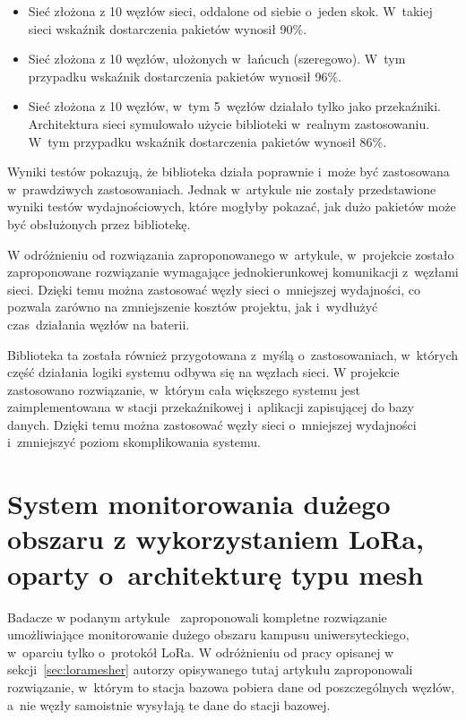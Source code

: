 \begin{itemize}
    \item Sieć złożona z 10 węzłów sieci, oddalone od siebie o~jeden skok. W~takiej sieci wskaźnik dostarczenia pakietów wynosił 90\%.
    \item Sieć złożona z 10 węzłów, ułożonych w~łańcuch (szeregowo). W~tym przypadku wskaźnik dostarczenia pakietów wynosił 96\%.
    \item Sieć złożona z 10 węzłów, w~tym 5~węzłów działało tylko jako przekaźniki. Architektura sieci symulowało użycie biblioteki w~realnym zastosowaniu. W~tym przypadku wskaźnik dostarczenia pakietów wynosił 86\%.
\end{itemize}

Wyniki testów pokazują, że biblioteka działa poprawnie i~może być zastosowana w~prawdziwych zastosowaniach.
Jednak w~artykule nie zostały przedstawione wyniki testów wydajnościowych, które mogłyby pokazać, jak dużo pakietów może być obsłużonych przez bibliotekę.

W odróżnieniu od rozwiązania zaproponowanego w~artykule, w~projekcie zostało zaproponowane rozwiązanie wymagające jednokierunkowej komunikacji z~węzłami sieci.
Dzięki temu można zastosować węzły sieci o~mniejszej wydajności, co pozwala zarówno na zmniejszenie kosztów projektu, jak i~wydłużyć czas~działania węzłów na baterii.

Biblioteka ta została również przygotowana z~myślą o~zastosowaniach, w~których część działania logiki systemu odbywa się na węzłach sieci.
W projekcie zastosowano rozwiązanie, w~którym cała większego systemu jest zaimplementowana w stacji przekaźnikowej i~aplikacji zapisującej do bazy danych.
Dzięki temu można zastosować węzły sieci o~mniejszej wydajności i~zmniejszyć poziom skomplikowania systemu.

\section{System monitorowania dużego obszaru z wykorzystaniem LoRa, oparty o~architekturę typu mesh}

Badacze w podanym artykule~\cite{bib:loramesh-lee} zaproponowali kompletne rozwiązanie umożliwiające monitorowanie dużego obszaru kampusu uniwersyteckiego, w~oparciu tylko o~protokół LoRa.
W odróżnieniu od pracy opisanej w sekcji~\ref{sec:loramesher} autorzy opisywanego tutaj artykułu zaproponowali rozwiązanie, w~którym to stacja bazowa pobiera dane od poszczególnych węzłów, a~nie węzły samoistnie wysyłają te dane do stacji bazowej.

